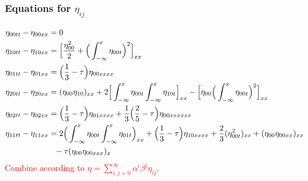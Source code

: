 \documentclass[pdftex,10pt,intlimits]{beamer}
\newcommand{\red}[1]{\textcolor{red}{#1}}
\begin{document}
\begin{frame}
  \frametitle{Equations for $\eta_{ij}$}
{\small\begin{equation*}\begin{aligned}
\eta_{00tt} - \eta_{00xx} &= 0\\
\eta_{10tt} - \eta_{10xx} &= \Big[\frac{\eta_{00}^2}{2} +
\Big(\int_{-\infty}^x\eta_{00t}\Big)^2\Big]_{xx}\\
\eta_{01tt} - \eta_{01xx} &= \Big(\frac{1}{3}-\tau\Big)\eta_{00xxxx}\\
\eta_{20tt} - \eta_{20xx} &= (\eta_{00}\eta_{10})_{xx} + 2
\Big[\int_{-\infty}^x\eta_{00t}\int_{-\infty}^x\eta_{10t}\Big]_{xx} -
\Big[\eta_{00}\Big(\int_{-\infty}^x\eta_{00t}\Big)^2\Big]_{xx}\\
\eta_{02tt} - \eta_{02xx} &= \Big(\frac{1}{3}-\tau\Big)\eta_{01xxxx} +
\frac{1}{3}\Big(\frac{2}{5}-\tau\Big)\eta_{00xxxxxx}\\
\eta_{11tt} - \eta_{11xx} &= 2\Big(\int_{-\infty}^x\eta_{00t}\int_{-\infty}^x\eta_{01t}\Big)_{xx} +
\Big(\frac{1}{3}-\tau\Big)\eta_{10xxxx} + \frac{2}{3}(\eta_{00t}^2)_{xx} + (\eta_{00}\eta_{00xx})_{xx}\\
& \hspace{0.25cm}- \tau(\eta_{00}\eta_{00xxx})_x
\end{aligned}\end{equation*}}
\red{Combine according to $\eta=\sum_{i,j=0}^\infty \alpha^i\beta^j\eta_{ij}$.}
\end{frame}
\end{document}
